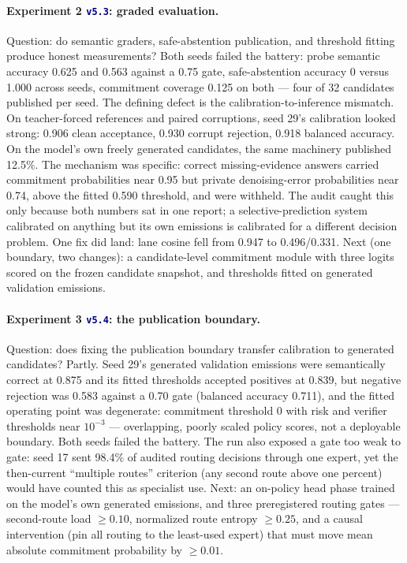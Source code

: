 \documentclass[10pt,a4paper]{article}
\newcommand{\studytag}[1]{\colorbox{navy!10}{\textcolor{navy}{\footnotesize\texttt{#1}}}}
\begin{document}
\paragraph{Experiment 2 \studytag{v5.3}: graded evaluation.}
Question: do semantic graders, safe-abstention publication, and threshold fitting produce honest measurements? Both seeds failed the battery: probe semantic accuracy 0.625 and 0.563 against a 0.75 gate, safe-abstention accuracy 0 versus 1.000 across seeds, commitment coverage 0.125 on both --- four of 32 candidates published per seed. The defining defect is the calibration-to-inference mismatch. On teacher-forced references and paired corruptions, seed 29's calibration looked strong: 0.906 clean acceptance, 0.930 corrupt rejection, 0.918 balanced accuracy. On the model's own freely generated candidates, the same machinery published 12.5\%. The mechanism was specific: correct missing-evidence answers carried commitment probabilities near 0.95 but private denoising-error probabilities near 0.74, above the fitted 0.590 threshold, and were withheld. The audit caught this only because both numbers sat in one report; a selective-prediction system calibrated on anything but its own emissions is calibrated for a different decision problem. One fix did land: lane cosine fell from 0.947 to 0.496/0.331. Next (one boundary, two changes): a candidate-level commitment module with three logits scored on the frozen candidate snapshot, and thresholds fitted on generated validation emissions.

\paragraph{Experiment 3 \studytag{v5.4}: the publication boundary.}
Question: does fixing the publication boundary transfer calibration to generated candidates? Partly. Seed 29's generated validation emissions were semantically correct at 0.875 and its fitted thresholds accepted positives at 0.839, but negative rejection was 0.583 against a 0.70 gate (balanced accuracy 0.711), and the fitted operating point was degenerate: commitment threshold 0 with risk and verifier thresholds near $10^{-3}$ --- overlapping, poorly scaled policy scores, not a deployable boundary. Both seeds failed the battery. The run also exposed a gate too weak to gate: seed 17 sent 98.4\% of audited routing decisions through one expert, yet the then-current ``multiple routes'' criterion (any second route above one percent) would have counted this as specialist use. Next: an on-policy head phase trained on the model's own generated emissions, and three preregistered routing gates --- second-route load $\geq 0.10$, normalized route entropy $\geq 0.25$, and a causal intervention (pin all routing to the least-used expert) that must move mean absolute commitment probability by $\geq 0.01$.
\end{document}
